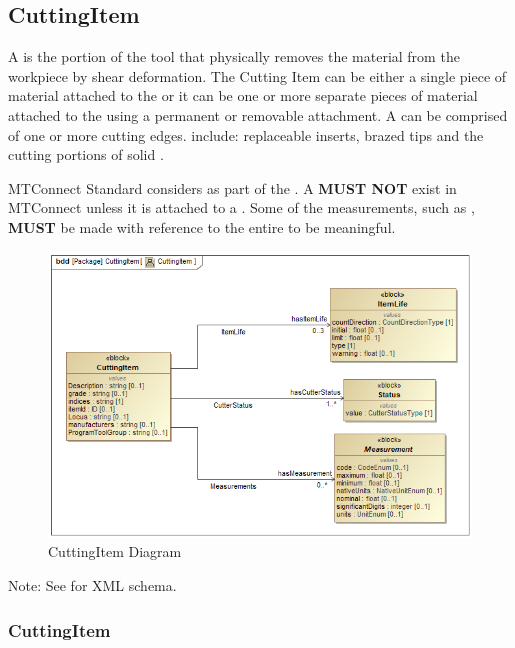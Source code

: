 \subsection{CuttingItem} \label{sec:CuttingItem}


A  is the portion of the tool that physically removes the material from the workpiece by shear deformation.  The Cutting Item can be either a single piece of material attached to the  or it can be one or more separate pieces of material attached to the  using a permanent or removable attachment.  A  can be comprised of one or more cutting edges.  include: replaceable inserts, brazed tips and the cutting portions of solid .

MTConnect Standard considers  as part of the .  A  \textbf{MUST NOT} exist in MTConnect unless it is attached to a .  Some of the measurements, such as , \textbf{MUST} be made with reference to the entire  to be meaningful.

\begin{figure}[ht]
  \centering
    \includegraphics[width=1.0\textwidth]{figures/CuttingItem.png}
  \caption{CuttingItem Diagram}
  \label{fig:CuttingItem Diagram}
\end{figure}

\FloatBarrier


Note: See  for XML schema.


\subsubsection{CuttingItem}




